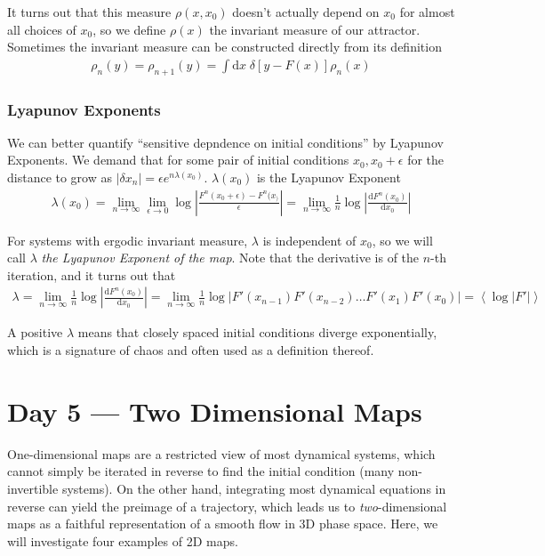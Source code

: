 \documentclass[10pt]{article}
\newcommand{\rd}[2]{\frac{\mathrm{d}#1}{\mathrm{d}#2}}
\newcommand{\abs}[1]{\left|#1\right|}
\newcommand{\expvalue}[1]{\left<#1\right>}
\begin{document}
It turns out that this measure $\rho(x,x_0)$ doesn't actually depend on $x_0$ for almost all choices of $x_0$, so we define $\rho(x)$ the invariant measure of our attractor. Sometimes the invariant measure can be constructed directly from its definition
\begin{align}
    \rho_n(y) = \rho_{n+1}(y) = \int \mathrm{d}x\; \delta \left[ y - F(x) \right]\rho_n(x)
\end{align}

\subsubsection{Lyapunov Exponents}

We can better quantify ``sensitive depndence on initial conditions'' by Lyapunov Exponents. We demand that for some pair of initial conditions $x_0, x_0 + \epsilon$ for the distance to grow as $\abs{\delta x_n} = \epsilon e^{n\lambda(x_0)}$. $\lambda(x_0)$ is the Lyapunov Exponent
\begin{align}
    \lambda(x_0) = \lim_{n \to \infty}\lim_{\epsilon \to 0}\log\abs{\frac{F^n(x_0 + \epsilon) - F^n(x_)}{\epsilon}} = \lim_{n \to \infty}\frac{1}{n}\log \abs{\rd{F^n(x_0)}{x_0}}
\end{align}

For systems with ergodic invariant measure, $\lambda$ is independent of $x_0$, so we will call $\lambda$ \emph{the Lyapunov Exponent of the map}. Note that the derivative is of the $n$-th iteration, and it turns out that
\begin{align}
    \lambda = \lim_{n \to \infty}\frac{1}{n}\log\abs{\rd{F^n(x_0)}{x_0}} = \lim_{n \to \infty}\frac{1}{n}\log \abs{F'(x_{n-1})F'(x_{n - 2})\dots F'(x_1) F'(x_0)} = \expvalue{\log\abs{F'}}
\end{align}

A positive $\lambda$ means that closely spaced initial conditions diverge exponentially, which is a signature of chaos and often used as a definition thereof.

\section{Day 5 --- Two Dimensional Maps}

One-dimensional maps are a restricted view of most dynamical systems, which cannot simply be iterated in reverse to find the initial condition (many non-invertible systems). On the other hand, integrating most dynamical equations in reverse can yield the preimage of a trajectory, which leads us to \emph{two}-dimensional maps as a faithful representation of a smooth flow in 3D phase space. Here, we will investigate four examples of 2D maps.
\end{document}
